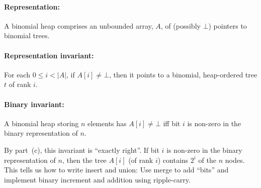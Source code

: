 \documentclass[a4paper]{article}
\begin{document}
\paragraph{Representation:}
A binomial heap comprises an unbounded array, $A$, of (possibly $\bot$) pointers to binomial trees.

\paragraph{Representation invariant:}
For each $0 \le i < |A|$, if $A[i] \not= \bot$, then it points to a binomial, heap-ordered tree $t$ of rank $i$.

\paragraph{Binary invariant:}
A binomial heap storing $n$ elements has $A[i] \not= \bot$ iff bit $i$ is non-zero in the binary representation of $n$.

By part~(c), this invariant is ``exactly right''.
If bit $i$ is non-zero in the binary representation of $n$, then the tree $A[i]$ (of rank $i$) contains $2^i$ of the $n$ nodes.
This tells us how to write insert and union:
Use merge to add ``bits'' and implement binary increment and addition using ripple-carry.
\end{document}
